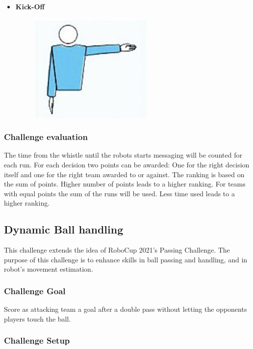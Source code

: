         \begin{itemize}
            \item \textbf{Kick-Off} 
            \begin{figure}[ht!]
                \includegraphics{figs/kick-off_referee.jpg}
            \end{figure}
        \end{itemize}

    \subsubsection{Challenge evaluation}
        The time from the whistle until the robots starts messaging will be counted for each run.
        For each decision two points can be awarded: One for the right decision itself and one for the right team awarded to or against.
        The ranking is based on the sum of points. Higher number of points leads to a higher ranking. For teams with equal points the sum of the runs will be used. Less time used leads to a higher ranking.
        

\subsection{Dynamic Ball handling}

    This challenge extends the idea of RoboCup 2021's Passing Challenge. The purpose of this challenge is to enhance skills in ball passing and handling, and in robot's movement estimation.

    \subsubsection{Challenge Goal}

    Score as attacking team a goal after a double pass without letting the opponents players touch the ball.

    \subsubsection{Challenge Setup}

